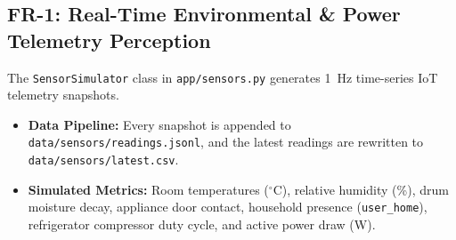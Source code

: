 \documentclass[conference]{IEEEtran}
\begin{document}
\subsection{FR-1: Real-Time Environmental \& Power Telemetry Perception}
The \texttt{SensorSimulator} class in \texttt{app/sensors.py} generates 1~Hz time-series IoT telemetry snapshots.
\begin{itemize}
    \item \textbf{Data Pipeline:} Every snapshot is appended to \texttt{data/sensors/readings.jsonl}, and the latest readings are rewritten to \texttt{data/sensors/latest.csv}.
    \item \textbf{Simulated Metrics:} Room temperatures ($^\circ$C), relative humidity (\%), drum moisture decay, appliance door contact, household presence (\texttt{user\_home}), refrigerator compressor duty cycle, and active power draw (W).
\end{itemize}
\end{document}
